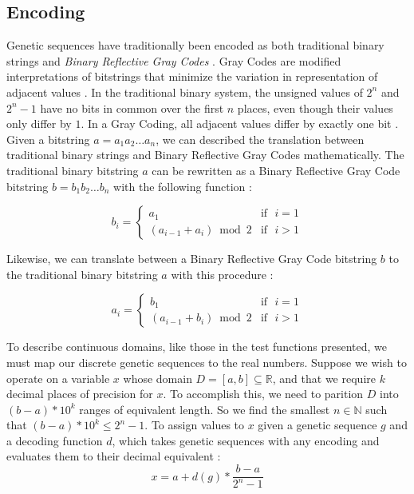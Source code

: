 \subsection*{Encoding}
Genetic sequences have traditionally been encoded as both traditional binary strings and \emph{Binary Reflective Gray Codes} \cite{Whitley97}. Gray Codes are modified interpretations of bitstrings that minimize the variation in representation of adjacent values \cite{Back93}. In the traditional binary system, the unsigned values of $2^n$ and $2^n - 1$ have no bits in common over the first $n$ places, even though their values only differ by $1$. In a Gray Coding, all adjacent values differ by exactly one bit \cite{Michalewicz98}. Given a bitstring $a = a_1 a_2 \ldots a_n$, we can described the translation between traditional binary strings and Binary Reflective Gray Codes mathematically. The traditional binary bitstring $a$ can be rewritten as a Binary Reflective Gray Code bitstring $b =  b_1 b_2 \ldots b_n$ with the following function \cite{Back93}:

\begin{displaymath}
   b_i = \left\{
     \begin{array}{cr}
       a_1 & \text{if~ } i = 1 \\
       (a_{i-1} + a_i) \bmod{2} & \text{if~ } i > 1
     \end{array}
   \right.
\end{displaymath} 

Likewise, we can translate between a Binary Reflective Gray Code bitstring $b$ to the traditional binary bitstring $a$ with this procedure \cite{Back93}:

\begin{displaymath}
   a_i = \left\{
     \begin{array}{cr}
       b_1 & \text{if~ } i = 1 \\
       (a_{i-1} + b_i) \bmod{2} & \text{if~ } i > 1
     \end{array}
   \right.
\end{displaymath} 

To describe continuous domains, like those in the test functions presented, we must map our discrete genetic sequences to the real numbers. Suppose we wish to operate on a variable $x$ whose domain $D = [a,b] \subseteq \mathbb{R}$, and that we require $k$ decimal places of precision for $x$. To accomplish this, we need to parition $D$ into $(b - a) * 10^k$ ranges of equivalent length. So we find the smallest $n \in \mathbb{N}$ such that $(b - a) * 10^k \leq 2^n - 1$. To assign values to $x$ given a genetic sequence $g$ and a decoding function $d$, which takes genetic sequences with any encoding and evaluates them to their decimal equivalent \cite{Michalewicz98}:
\[ x = a + d(g) * \frac{b-a}{2^n - 1} \]

